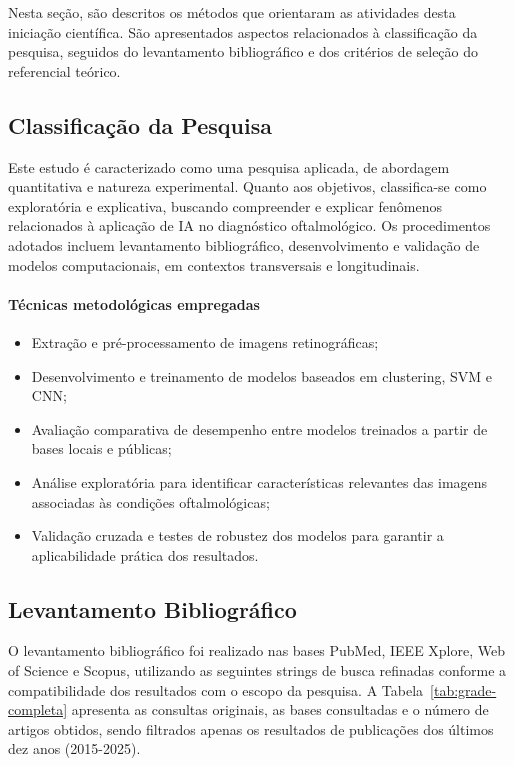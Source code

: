 \renewcommand{\thesubsection}{\Alph{subsection}}

Nesta seção, são descritos os métodos que orientaram as atividades desta iniciação científica. São apresentados aspectos relacionados à classificação da pesquisa, seguidos do levantamento bibliográfico e dos critérios de seleção do referencial teórico.

\subsection{Classificação da Pesquisa}
\label{ssec:classificacao-pesquisa}

Este estudo é caracterizado como uma pesquisa aplicada, de abordagem quantitativa e natureza experimental. Quanto aos objetivos, classifica-se como exploratória e explicativa, buscando compreender e explicar fenômenos relacionados à aplicação de IA no diagnóstico oftalmológico. Os procedimentos adotados incluem levantamento bibliográfico, desenvolvimento e validação de modelos computacionais, em contextos transversais e longitudinais.

\paragraph{Técnicas metodológicas empregadas}
\begin{itemize}
  \item Extração e pré-processamento de imagens retinográficas;
  \item Desenvolvimento e treinamento de modelos baseados em clustering, SVM e CNN;
  \item Avaliação comparativa de desempenho entre modelos treinados a partir de bases locais e públicas;
  \item Análise exploratória para identificar características relevantes das imagens associadas às condições oftalmológicas;
  \item Validação cruzada e testes de robustez dos modelos para garantir a aplicabilidade prática dos resultados.
\end{itemize}

\subsection{Levantamento Bibliográfico}
\label{ssec:levantamento-bibliografico}

O levantamento bibliográfico foi realizado nas bases PubMed, IEEE Xplore, Web of Science e Scopus, utilizando as seguintes strings de busca refinadas conforme a compatibilidade dos resultados com o escopo da pesquisa. A Tabela~\ref{tab:grade-completa} apresenta as consultas originais, as bases consultadas e o número de artigos obtidos, sendo filtrados apenas os resultados de publicações dos últimos dez anos (2015-2025).

